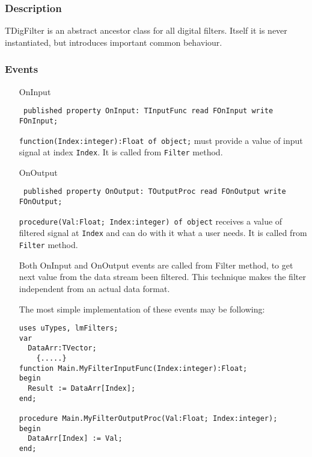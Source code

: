 \documentclass[12pt,a4paper,oneside]{report}
\newcommand{\declarationitem}[1]{{\addfontfeatures{FakeBold=1.3} #1}}
\newcommand{\code}[1]{\texttt{#1}}
\begin{document}
\subsubsection{Description}
TDigFilter is an abstract ancestor class for all digital filters. Itself it is never instantiated, but introduces important common behaviour. 
\subsubsection{Events}
\begin{itemize}\label{lmfilters.TDigFilter-OnInput}
	\item[\declarationitem{OnInput}\hfill]
	\begin{flushleft}
		\code{
			published property OnInput: TInputFunc read FOnInput write FOnInput;}
	\end{flushleft}
	\par \code{function(Index:integer):Float of object;} must provide a value of input signal at index \code{Index}. It is called from \code{Filter}\label{lmfilters.TDigFilter-OnOutput} method.
	\item[\declarationitem{OnOutput}\hfill]
	\begin{flushleft}
		\code{
			published property OnOutput: TOutputProc read FOnOutput write FOnOutput;}
	\end{flushleft}
	\par \code{procedure(Val:Float; Index:integer) of object} receives a value of filtered signal at \code{Index} and can do with it what a user needs. It is called from \code{Filter} method.

	Both OnInput and OnOutput events are called from Filter method, to get next value from the data stream been filtered. This technique makes the filter independent from an actual data format.

	The most simple implementation of these events may be following:
\begin{verbatim}
uses uTypes, lmFilters;
var
  DataArr:TVector;
	{.....}
function Main.MyFilterInputFunc(Index:integer):Float;
begin
  Result := DataArr[Index];
end;

procedure Main.MyFilterOutputProc(Val:Float; Index:integer);
begin
  DataArr[Index] := Val;
end;
\end{verbatim}

\end{itemize}
\end{document}
